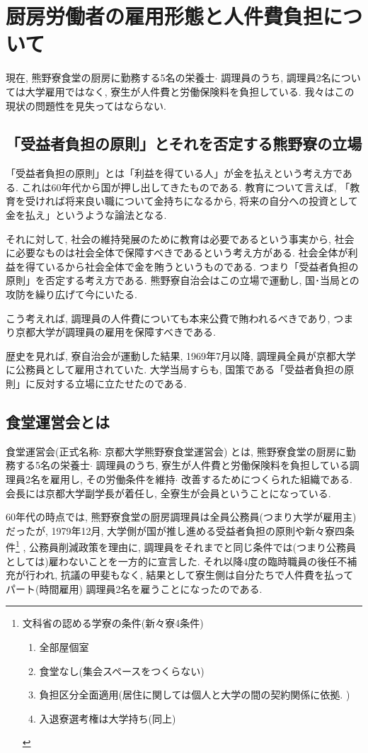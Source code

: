 \documentclass[10pt,b5jsbook,dvips,dvipdfmx,openany]{jsbook}
\theoremstyle{definition}
\begin{document}
	\section{厨房労働者の雇用形態と人件費負担について}

	現在, 熊野寮食堂の厨房に勤務する5名の栄養士$ \cdot $ 調理員のうち, 調理員2名については大学雇用ではなく, 寮生が人件費と労働保険料を負担している. 我々はこの現状の問題性を見失ってはならない. 

		\subsection{「受益者負担の原則」とそれを否定する熊野寮の立場}

	「受益者負担の原則」とは「利益を得ている人」が金を払えという考え方である. これは60年代から国が押し出してきたものである. 教育について言えば, 「教育を受ければ将来良い職について金持ちになるから, 将来の自分への投資として金を払え」というような論法となる. 
	
	それに対して, 社会の維持発展のために教育は必要であるという事実から, 社会に必要なものは社会全体で保障すべきであるという考え方がある. 社会全体が利益を得ているから社会全体で金を賄うというものである. つまり「受益者負担の原則」を否定する考え方である. 熊野寮自治会はこの立場で運動し, 国･当局との攻防を繰り広げて今にいたる. 
	
	こう考えれば, 調理員の人件費についても本来公費で賄われるべきであり, つまり京都大学が調理員の雇用を保障すべきである. 

	歴史を見れば, 寮自治会が運動した結果, 1969年7月以降, 調理員全員が京都大学に公務員として雇用されていた. 大学当局すらも, 国策である「受益者負担の原則」に反対する立場に立たせたのである. 


		\subsection{食堂運営会とは}

		食堂運営会(正式名称: 京都大学熊野寮食堂運営会) とは, 熊野寮食堂の厨房に勤務する5名の栄養士$ \cdot $ 調理員のうち, 寮生が人件費と労働保険料を負担している調理員2名を雇用し, その労働条件を維持$ \cdot $ 改善するためにつくられた組織である. 会長には京都大学副学長が着任し, 全寮生が会員ということになっている. 

		60年代の時点では, 熊野寮食堂の厨房調理員は全員公務員(つまり大学が雇用主) だったが, 1979年12月, 大学側が国が推し進める受益者負担の原則や新々寮四条件\footnote{文科省の認める学寮の条件(新々寮4条件) 
\begin{enumerate}
\item 全部屋個室
\item 食堂なし(集会スペースをつくらない) 
\item 負担区分全面適用(居住に関しては個人と大学の間の契約関係に依拠. ) 
\item 入退寮選考権は大学持ち(同上) 
\end{enumerate}} , 公務員削減政策を理由に, 調理員をそれまでと同じ条件では(つまり公務員としては)雇わないことを一方的に宣言した. それ以降4度の臨時職員の後任不補充が行われ, 抗議の甲斐もなく, 結果として寮生側は自分たちで人件費を払ってパート(時間雇用) 調理員2名を雇うことになったのである. 
\end{document}
